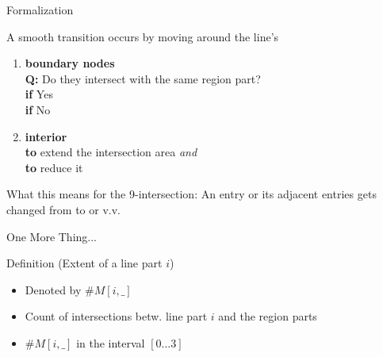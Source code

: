 	
	\begin{frame}{Formalization}
		\begin{block}{A smooth transition occurs by moving around the line's}
		\begin{enumerate}
			\item \textbf{boundary nodes}\\ \vspace{6pt}
			\textbf{Q:} Do they intersect with the same region part?\\
			 \textbf{if} Yes\\
			 \textbf{if} No
			
			\item \textbf{interior}\\ \vspace{6pt}
			 \textbf{to} extend the intersection area \textit{and}\\
			 \textbf{to} reduce it
		\end{enumerate}
		\end{block}
		
		\begin{block}{What this means for the 9-intersection:}
			 An entry or its adjacent entries gets changed from \Empty{} to \NotEmpty{} or v.v.
		\end{block}
	\end{frame}

	
	\begin{frame}{One More Thing...}
		\begin{block}{Definition (Extent of a line part $i$)}
			\begin{itemize}
				\item Denoted by $\#M[i, \_]$
				\item Count of intersections betw. line part $i$ and the region parts
				\item $\#M[i, \_]$ in the interval $[0\dots 3]$
			\end{itemize}
		\end{block}
	\end{frame}

	
